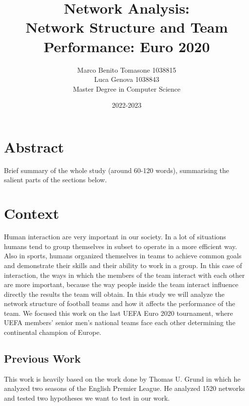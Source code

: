 \documentclass[12pt, a4paper]{article}
\author{Marco Benito Tomasone 1038815 \\ 
        Luca Genova  1038843\\
 Master Degree in Computer Science\\}
\date{2022-2023}
\title{Network Analysis:\\ Network Structure and Team Performance: Euro 2020}
\begin{document}
\maketitle

\section{Abstract}
\label{abstract-not-needed-for-the-project-proposal}

Brief summary of the whole study (around 60-120 words), summarising the
salient parts of the sections below.

\section{Context}
\label{context}
Human interaction are very important in our society. In a lot of situations humans tend to group themselves in subset to operate in a more efficient way. Also in sports, humans organized themselves in teams to achieve common goals and demonstrate their skills and their ability to work in a group. In this case of interaction, the ways in which the members of the team interact with each other are more important, because the way people inside the team interact influence directly the results the team will obtain. In this study we will analyze the network structure of football teams and how it affects the performance of the team. We focused this work on the last UEFA Euro 2020 tournament, where UEFA members' senior men's national teams face each other determining the continental champion of Europe.
\subsection{Previous Work}
This work is heavily based on the work done by Thomas U. Grund \cite{GRUND} in which he analyzed two seasons of the English Premier League. He analyzed 1520 networks and tested two hypotheses we want to test in our work. 
\end{document}
